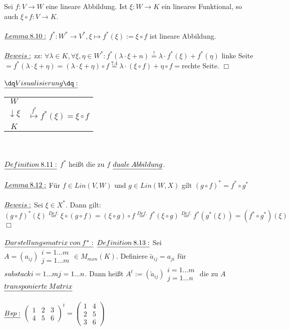 \documentclass[fleqn, a4paper, 11pt]{article}
\begin{document}
Sei $f:V\rightarrow W$ eine lineare Abbildung. Ist $\xi:W\rightarrow K$ ein lineares Funktional, so auch $\xi\circ f:V\rightarrow K$.\\
\\
$\uline{Lemma\:8.10:}$ $f^{\ast}:W^{\ast}\rightarrow V^{\ast},\xi\mapsto f^{\ast}(\xi):=\xi\circ f$ ist lineare Abbildung.\\
\\
$\uline{Beweis:}$ zz: $\forall\lambda\in K,\forall\xi,\eta\in W^{\ast}:f^{\ast}(\lambda\cdot\xi + n)\stackrel{!}{=}\lambda\cdot f^{\ast}(\xi)+f^{\ast}(\eta)$
linke Seite$=f^{\ast}(\lambda\cdot\xi +\eta)=(\lambda\cdot\xi +\eta)\circ f\stackrel{7.4}{=}\lambda\cdot(\xi\circ f)+\eta\circ f=$rechte Seite. \hfill $\Box$\\
\\
$\uline{\dq Visualisierung\dq:}$ \begin{tabular}{cc}
	$W$ & \\
	$\downarrow\xi$ & $\stackrel{f^{\ast}}{\mapsto}f^{\ast}(\xi)=\xi\circ f$\\
	$K$ & 
\end{tabular}\\
\\
$\uline{Definition\:8.11:}$ $f^{\ast}$ hei\ss{}t die zu $f$ $\uline{duale\:Abbildung}$.\\
\\
$\uline{Lemma\:8.12:}$ F\"ur $f\in Lin(V,W)$ und $g\in Lin(W,X)$ gilt $(g\circ f)^{\ast}=f^{\ast}\circ g^{\ast}$\\
\\
$\uline{Beweis:}$ Sei $\xi\in X^{\ast}$. Dann gilt: $(g\circ f)^{\ast}(\xi)\stackrel{Def.}{=}\xi\circ(g\circ f)=(\xi\circ g)\circ f\stackrel{Def.}{=}f^{\ast}(\xi\circ g)\stackrel{Def.}{=}f^{\ast}(g^{\ast}(\xi))=(f^{\ast}\circ g^{\ast})(\xi)$ \hfill $\Box$\\
\\
$\uline{Darstellungsmatrix\:von\:f^{\ast}:}$ $\uline{Definition\:8.13:}$ Sei $A=(a_{ij})\substack{i=1...m\\j=1...m}\in M_{mxn}(K)$. Definiere $\tilde{a}_{ij}=a_{ji}$ f\"ur $substack{i=1...m\\j=1...n}$. Dann hei\ss{}t $A^t:=(\tilde{a}_{ij})\substack{i=1...m\\j=1...n}$ die zu $A$ $\uline{transponierte\:Matrix}$\\
\\
$\uline{Bsp:}$ $\begin{pmatrix}
	1 & 2 & 3\\
	4 & 5 & 6 
\end{pmatrix}^t=\begin{pmatrix}
	1 & 4\\
	2 & 5\\
	3 & 6
\end{pmatrix}$\\
\end{document}
